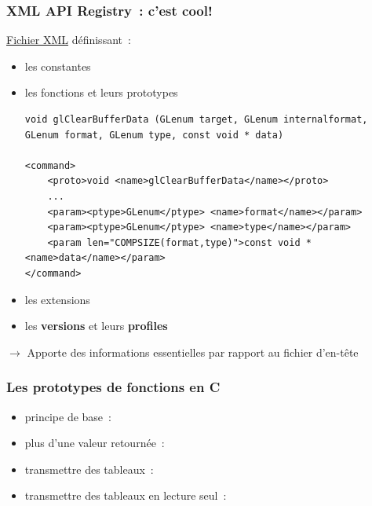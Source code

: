 \begin{frame}[fragile]
  \frametitle{XML API Registry~:  c'est cool!}
  \href{https://www.opengl.org/registry}{Fichier XML} définissant~: \\
  \begin{itemize}
    \item les constantes
    \item les fonctions et leurs prototypes \\
      {\tiny%
\begin{verbatim}
void glClearBufferData (GLenum target, GLenum internalformat, GLenum format, GLenum type, const void * data)

<command>
    <proto>void <name>glClearBufferData</name></proto>
    ...
    <param><ptype>GLenum</ptype> <name>format</name></param>
    <param><ptype>GLenum</ptype> <name>type</name></param>
    <param len="COMPSIZE(format,type)">const void *<name>data</name></param>
</command>
\end{verbatim}}
    \item les extensions
    \item les \textbf{versions} et leurs \textbf{profiles}
  \end{itemize}
  \centerline{\alert{$\longrightarrow$ Apporte des informations essentielles par rapport au fichier d'en-tête}}
\end{frame}

\begin{frame}
  \frametitle{Les prototypes de fonctions en C}
  \begin{itemize}
    \item principe de base~: \\
    \item plus d'une valeur retournée~: \\
    \item transmettre des tableaux~: \\
    \item transmettre des tableaux en lecture seul~: \\
  \end{itemize}
\end{frame}

